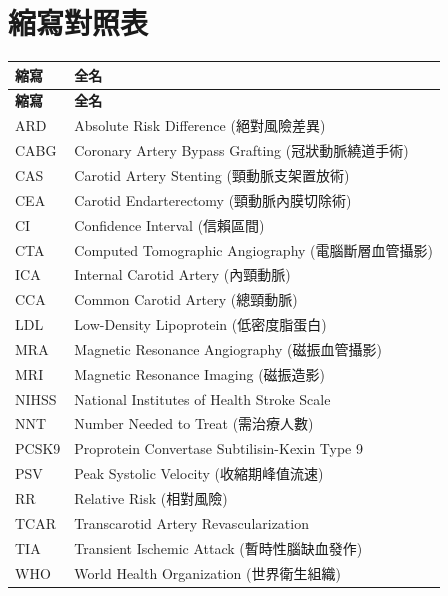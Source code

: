 \documentclass[12pt,a4paper]{article}
\begin{document}
\section{縮寫對照表}

\begin{longtable}{p{4cm}p{10cm}}
\toprule
\textbf{縮寫} & \textbf{全名} \\
\midrule
\endfirsthead

\toprule
\textbf{縮寫} & \textbf{全名} \\
\midrule
\endhead

\bottomrule
\endfoot

ARD & Absolute Risk Difference (絕對風險差異) \\
CABG & Coronary Artery Bypass Grafting (冠狀動脈繞道手術) \\
CAS & Carotid Artery Stenting (頸動脈支架置放術) \\
CEA & Carotid Endarterectomy (頸動脈內膜切除術) \\
CI & Confidence Interval (信賴區間) \\
CTA & Computed Tomographic Angiography (電腦斷層血管攝影) \\
ICA & Internal Carotid Artery (內頸動脈) \\
CCA & Common Carotid Artery (總頸動脈) \\
LDL & Low-Density Lipoprotein (低密度脂蛋白) \\
MRA & Magnetic Resonance Angiography (磁振血管攝影) \\
MRI & Magnetic Resonance Imaging (磁振造影) \\
NIHSS & National Institutes of Health Stroke Scale \\
NNT & Number Needed to Treat (需治療人數) \\
PCSK9 & Proprotein Convertase Subtilisin-Kexin Type 9 \\
PSV & Peak Systolic Velocity (收縮期峰值流速) \\
RR & Relative Risk (相對風險) \\
TCAR & Transcarotid Artery Revascularization \\
TIA & Transient Ischemic Attack (暫時性腦缺血發作) \\
WHO & World Health Organization (世界衛生組織) \\
\bottomrule
\end{longtable}
\end{document}
